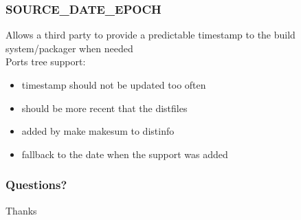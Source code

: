 \begin{frame}
	\frametitle{SOURCE\_DATE\_EPOCH}
	Allows a third party to provide a predictable timestamp to the build system/packager when needed \\
	Ports tree support:
	\begin{itemize}
		\item timestamp should not be updated too often
		\item should be more recent that the distfiles
		\item added by make makesum to distinfo
		\item fallback to the date when the support was added
	\end{itemize}
\end{frame}

\begin{frame}
	\frametitle{Questions?}
	\center
	\huge Thanks
\end{frame}


